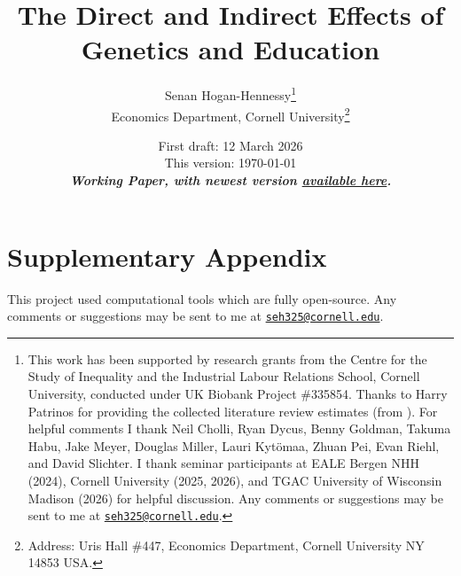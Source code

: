 \documentclass[notitlepage,12pt]{article}
\author{Senan Hogan-Hennessy\thanks{
    This work has been supported by research grants from the Centre for the Study of Inequality and the Industrial Labour Relations School, Cornell University, conducted under UK Biobank Project \#335854.
    Thanks to Harry Patrinos for providing the collected literature review estimates (from \citealt{patrinos2025causal}).
    For helpful comments I thank
    Neil Cholli,
    Ryan Dycus,
    Benny Goldman,
    Takuma Habu,
    Jake Meyer,
    Douglas Miller,
    Lauri Kytömaa,
    Zhuan Pei,
    Evan Riehl,
    and
    David Slichter.
    I thank seminar participants at EALE Bergen NHH (2024), Cornell University (2025, 2026), and TGAC University of Wisconsin Madison (2026) for helpful discussion.
    Any comments or suggestions may be sent to me at \href{mailto:seh325@cornell.edu}{\nolinkurl{seh325@cornell.edu}}.
    } \\
    \vspace{0.1cm}
    Economics Department, Cornell University\footnote{
        Address: Uris Hall \#447, Economics Department, Cornell University NY 14853 USA.
    }
}
\title{The Direct and Indirect Effects of \\Genetics and Education}
\date{
    \vskip-0.5cm
    First draft: 12 March 2026 \\
    This version:
    \today
    \\ \vspace{0.25cm}
    \textbf{\textit{Working Paper, with newest version
        \href{https:shoganhennessy.github.io/files/research/direct-indirect-education-2026.pdf}{available here}.}}
    \vspace{-1.25cm}
}
\begin{document}
\clearpage
\maketitle
\thispagestyle{empty}
\begin{abstract}
    
\end{abstract}

\newpage
\setcounter{page}{1}
\onehalfspacing
\noindent










\singlespacing

%



\newpage
\appendix
\setcounter{table}{0}
\renewcommand{\thetable}{A\arabic{table}}
\setcounter{figure}{0}
\renewcommand{\thefigure}{A\arabic{figure}}

\section{Supplementary Appendix}
\label{appendix}
This project used computational tools which are fully open-source.
Any comments or suggestions may be sent to me at \href{mailto:seh325@cornell.edu}{\nolinkurl{seh325@cornell.edu}}.


\end{document}
